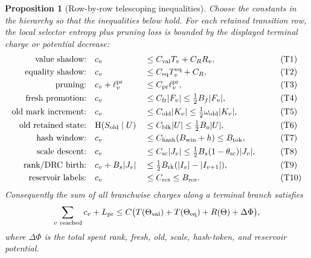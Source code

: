 \documentclass[11pt]{article}
\newtheorem{proposition}[theorem]{Proposition}
\theoremstyle{remark}
\newcommand{\HH}{\mathrm H}
\newcommand{\pr}{\mathrm{pr}}
\newcommand{\win}{\mathrm{win}}
\newcommand{\old}{\mathrm{old}}
\newcommand{\fr}{\mathrm{fr}}
\newcommand{\scal}{\mathrm{sc}}
\newcommand{\rk}{\mathrm{rk}}
\begin{document}
\begin{proposition}[Row-by-row telescoping inequalities]\label{prop:appendix-row-telescope}
Choose the constants in the hierarchy so that the inequalities below hold.  For each retained transition row, the local selector entropy plus pruning loss is bounded by the displayed terminal charge or potential decrease:
\begin{alignat}{3}
\text{value shadow:}       &\quad c_v &&\le C_{\rm val}T_v+C_R R_v,                                      &&\tag{T1}\label{eq:T1}\\
\text{equality shadow:}    &\quad c_v &&\le C_{\rm eq}T^{\rm eq}_v+C_R,                                  &&\tag{T2}\label{eq:T2}\\
\text{pruning:}            &\quad c_v+\ell_v^{\pr} &&\le C_{\pr}\ell_v^{\pr},                            &&\tag{T3}\label{eq:T3}\\
\text{fresh promotion:}    &\quad c_v &&\le C_{\fr}|F_v|\le \tfrac12 B_f|F_v|,                            &&\tag{T4}\label{eq:T4}\\
\text{old mark increment:} &\quad c_v &&\le C_{\old}|K_v|\le \tfrac12\omega_{\old}|K_v|,                  &&\tag{T5}\label{eq:T5}\\
\text{old retained state:} &\quad \HH(S_{\old}\mid U) &&\le C_{\rm blk}|U|\le \tfrac12 B_o|U|,            &&\tag{T6}\label{eq:T6}\\
\text{hash window:}        &\quad c_v &&\le C_{\rm hash}(B_{\win}+h)\le B_{\rm tok},                     &&\tag{T7}\label{eq:T7}\\
\text{scale descent:}      &\quad c_v &&\le C_{\scal}|J_v|\le \tfrac12 B_s(1-\theta_{\scal})|J_v|,         &&\tag{T8}\label{eq:T8}\\
\text{rank/DRC birth:}     &\quad c_v+B_s|J_v| &&\le \tfrac12 B_{\rk}(|I_v|-|I_{v+1}|),                  &&\tag{T9}\label{eq:T9}\\
\text{reservoir labels:}   &\quad c_v &&\le C_{\rm res}\le B_{\rm res}.                                  &&\tag{T10}\label{eq:T10}
\end{alignat}
Consequently the sum of all branchwise charges along a terminal branch satisfies
\[
        \sum_{v\ {\rm reached}} c_v+L_{\pr}
        \le C\bigl(T(\Theta_{\rm val})+T(\Theta_{\rm eq})+R(\Theta)+\Delta\Phi\bigr),
\]
where $\Delta\Phi$ is the total spent rank, fresh, old, scale, hash-token, and reservoir potential.
\end{proposition}
\end{document}
